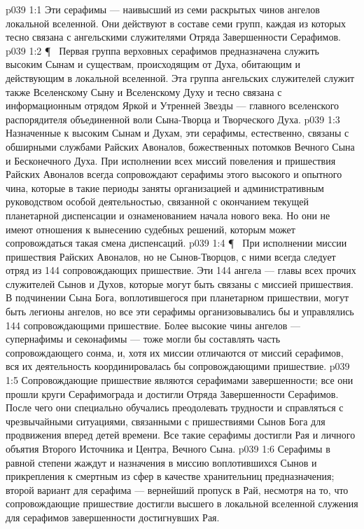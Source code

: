 \vs p039 1:1 Эти серафимы --- наивысший из семи раскрытых чинов ангелов локальной вселенной. Они действуют в составе семи групп, каждая из которых тесно связана с ангельскими служителями Отряда Завершенности Серафимов.
\vs p039 1:2 \P\ \bibnobreakspace {} Первая группа верховных серафимов предназначена служить высоким Сынам и существам, происходящим от Духа, обитающим и действующим в локальной вселенной. Эта группа ангельских служителей служит также Вселенскому Сыну и Вселенскому Духу и тесно связана с информационным отрядом Яркой и Утренней Звезды --- главного вселенского распорядителя объединенной воли Сына\hyp{}Творца и Творческого Духа.
\vs p039 1:3 Назначенные к высоким Сынам и Духам, эти серафимы, естественно, связаны с обширными службами Райских Авоналов, божественных потомков Вечного Сына и Бесконечного Духа. При исполнении всех миссий повеления и пришествия Райских Авоналов всегда сопровождают серафимы этого высокого и опытного чина, которые в такие периоды заняты организацией и административным руководством особой деятельностью, связанной с окончанием текущей планетарной диспенсации и ознаменованием начала нового века. Но они не имеют отношения к вынесению судебных решений, которым может сопровождаться такая смена диспенсаций.
\vs p039 1:4 \P\  При исполнении миссии пришествия Райских Авоналов, но не Сынов\hyp{}Творцов, с ними всегда следует отряд из 144 сопровождающих пришествие. Эти 144 ангела --- главы всех прочих служителей Сынов и Духов, которые могут быть связаны с миссией пришествия. В подчинении Сына Бога, воплотившегося при планетарном пришествии, могут быть легионы ангелов, но все эти серафимы организовывались бы и управлялись 144 сопровождающими пришествие. Более высокие чины ангелов --- супернафимы и секонафимы --- тоже могли бы составлять часть сопровождающего сонма, и, хотя их миссии отличаются от миссий серафимов, вся их деятельность координировалась бы сопровождающими пришествие.
\vs p039 1:5 Сопровождающие пришествие являются серафимами завершенности; все они прошли круги Серафимограда и достигли Отряда Завершенности Серафимов. После чего они специально обучались преодолевать трудности и справляться с чрезвычайными ситуациями, связанными с пришествиями Сынов Бога для продвижения вперед детей времени. Все такие серафимы достигли Рая и личного объятия Второго Источника и Центра, Вечного Сына.
\vs p039 1:6 Серафимы в равной степени жаждут и назначения в миссию воплотившихся Сынов и прикрепления к смертным из сфер в качестве хранительниц предназначения; второй вариант для серафима --- вернейший пропуск в Рай, несмотря на то, что сопровождающие пришествие достигли высшего в локальной вселенной служения для серафимов завершенности достигнувших Рая.
